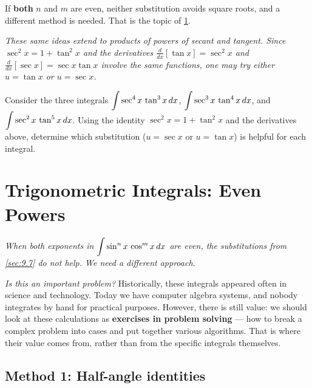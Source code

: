 \begin{remark}
If \textbf{both} $n$ and $m$ are even, neither substitution avoids square roots, and a different method is needed.  That is the topic of \cref{sec:9.8}.
\end{remark}

\textit{These same ideas extend to products of powers of secant and tangent.  Since $\sec^{2}x = 1 + \tan^{2}x$ and the derivatives $\frac{d}{dx}[\tan x] = \sec^{2}x$ and $\frac{d}{dx}[\sec x] = \sec x\tan x$ involve the same functions, one may try either $u = \tan x$ or $u = \sec x$.}

\begin{remark}
Consider the three integrals $\displaystyle\int \sec^{4}x\,\tan^{3}x\,dx$, $\displaystyle\int \sec^{3}x\,\tan^{4}x\,dx$, and $\displaystyle\int \sec^{2}x\,\tan^{5}x\,dx$.  Using the identity $\sec^{2}x = 1 + \tan^{2}x$ and the derivatives above, determine which substitution ($u = \sec x$ or $u = \tan x$) is helpful for each integral.
\end{remark}

\section{Trigonometric Integrals: Even Powers}
\label{sec:9.8}

\textit{When both exponents in $\displaystyle\int \sin^{n}x\,\cos^{m}x\,dx$ are even, the substitutions from \cref{sec:9.7} do not help.  We need a different approach.}

\begin{remark}
\textit{Is this an important problem?}  Historically, these integrals appeared often in science and technology.  Today we have computer algebra systems, and nobody integrates by hand for practical purposes.  However, there is still value: we should look at these calculations as \textbf{exercises in problem solving} --- how to break a complex problem into cases and put together various algorithms.  That is where their value comes from, rather than from the specific integrals themselves.
\end{remark}

\subsection*{Method 1: Half-angle identities}

